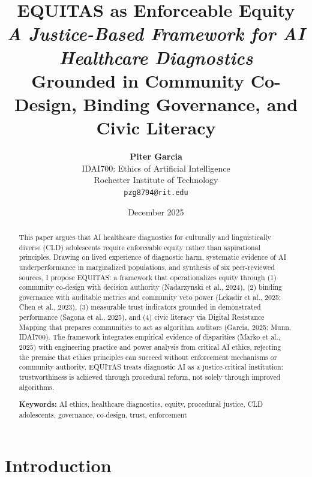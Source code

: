 \documentclass[12pt,letterpaper]{article}
\title{\vspace{-1.5cm}
\Large \textbf{EQUITAS as Enforceable Equity}\\
\normalsize \textit{A Justice-Based Framework for AI Healthcare Diagnostics}\\
\normalsize Grounded in Community Co-Design, Binding Governance, and Civic Literacy\\
\vspace{0.3cm}
}
\author{\textbf{Piter Garcia}\\
IDAI700: Ethics of Artificial Intelligence\\
Rochester Institute of Technology\\
\texttt{pzg8794@rit.edu}
}
\date{December 2025}
\begin{document}
\maketitle

\begin{abstract}
\noindent This paper argues that AI healthcare diagnostics for culturally and linguistically diverse (CLD) adolescents require enforceable equity rather than aspirational principles. Drawing on lived experience of diagnostic harm, systematic evidence of AI underperformance in marginalized populations, and synthesis of six peer-reviewed sources, I propose EQUITAS: a framework that operationalizes equity through (1) community co-design with decision authority (Nadarzynski et al., 2024), (2) binding governance with auditable metrics and community veto power (Lekadir et al., 2025; Chen et al., 2023), (3) measurable trust indicators grounded in demonstrated performance (Sagona et al., 2025), and (4) civic literacy via Digital Resistance Mapping that prepares communities to act as algorithm auditors (Garcia, 2025; Munn, IDAI700). The framework integrates empirical evidence of disparities (Marko et al., 2025) with engineering practice and power analysis from critical AI ethics, rejecting the premise that ethics principles can succeed without enforcement mechanisms or community authority. EQUITAS treats diagnostic AI as a justice-critical institution: trustworthiness is achieved through procedural reform, not solely through improved algorithms.

\noindent \textbf{Keywords:} AI ethics, healthcare diagnostics, equity, procedural justice, CLD adolescents, governance, co-design, trust, enforcement

\end{abstract}

\newpage

\tableofcontents

\newpage

\section{Introduction}
\end{document}
